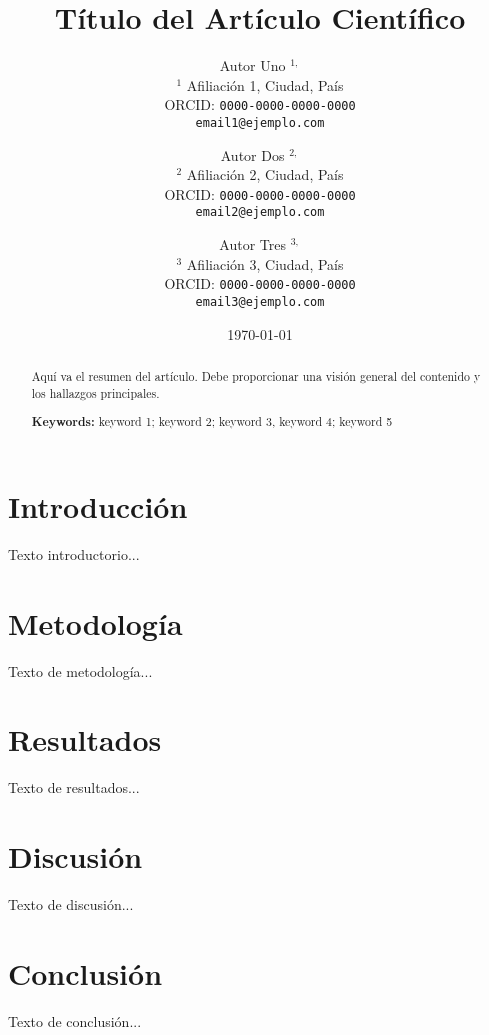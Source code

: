 \documentclass[a4paper,12pt]{article}
\title{\textbf{Título del Artículo Científico}}
\author{
Autor Uno $^{1,}$ \\
\small $^1$ Afiliación 1, Ciudad, País \\
\small ORCID: \texttt{0000-0000-0000-0000} \\
\small \texttt{email1@ejemplo.com} 
\and
Autor Dos $^{2,}$ \\
\small $^2$ Afiliación 2, Ciudad, País \\
\small ORCID: \texttt{0000-0000-0000-0000} \\
\small \texttt{email2@ejemplo.com} 
\and
Autor Tres $^{3,}$\\
\small $^3$ Afiliación 3, Ciudad, País \\
\small ORCID: \texttt{0000-0000-0000-0000} \\
\small \texttt{email3@ejemplo.com} 
}
\date{\today}
\begin{document}
\maketitle

\begin{abstract}
Aquí va el resumen del artículo. Debe proporcionar una visión general del contenido y los hallazgos principales.

\textbf{Keywords:} keyword 1; keyword 2; keyword 3, keyword 4; keyword 5

\end{abstract}

\section{Introducción}
Texto introductorio...\cite{Autor2020}

\section{Metodología}
Texto de metodología...

\section{Resultados}
Texto de resultados...

\section{Discusión}
Texto de discusión...

\section{Conclusión}
Texto de conclusión...


\printbibliography %
\end{document}
